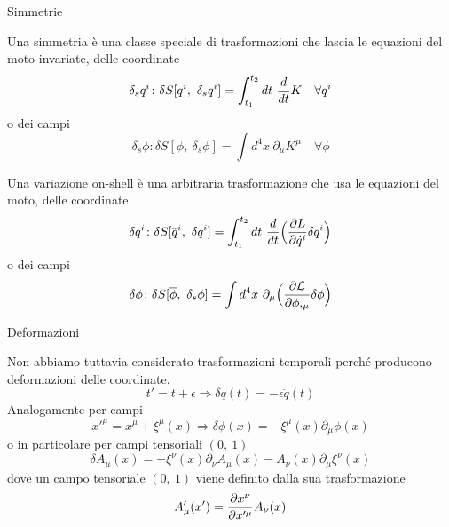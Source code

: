 \begin{frame}{Simmetrie}
    
    Una simmetria è una classe speciale di trasformazioni che lascia le equazioni del moto invariate, delle coordinate
    \begin{equation*}
         \delta_s q^i \colon \delta S[q^i, ~\delta_s q^i] = \int_{t_1}^{t_2}dt~ \frac{d}{dt} K \quad \forall q^i
    \end{equation*} 
    o dei campi
    \begin{equation*}
         \delta_s \phi \colon \delta S[\phi, ~\delta_s \phi] = \int d^4 x ~ \partial_\mu K^\mu \quad \forall \phi
    \end{equation*}

    Una variazione on-shell è una arbitraria trasformazione che usa le equazioni del moto, delle coordinate
    \begin{equation*}
        \delta q^i \colon \delta S[\overline q^i,~\delta q^i] = \int_{t_1}^{t_2}dt~ \frac{d}{dt} \Big( \frac{\partial L}{\partial\dot q^i} \delta q^i \Big )
    \end{equation*} 
    o dei campi
    \begin{equation*}
        \delta \phi \colon \delta S[\overline \phi, ~\delta_s \phi] = \int d^4 x ~ \partial_\mu \Big ( \frac{\partial\mathcal L}{\partial\phi,_\mu}  \delta \phi \Big) 
    \end{equation*}

\end{frame}

\begin{frame}{Deformazioni}
    
    Non abbiamo tuttavia considerato trasformazioni temporali perché producono deformazioni delle coordinate.
    \begin{equation*}
        t' = t + \epsilon \Rightarrow \delta q(t) = - \epsilon \dot q(t)
    \end{equation*}
    Analogamente per campi 
    \begin{equation*}
        x'^\mu = x^\mu + \xi^\mu(x) \Rightarrow \delta \phi(x) = - \xi^\mu(x) \partial_\mu \phi(x)
    \end{equation*}
    o in particolare per campi tensoriali $(0,~1)$ 
    \begin{equation*}
        \delta A_\mu(x) = - \xi^\nu(x) \partial_\nu A_\mu (x) - A_\nu(x) \partial_\mu \xi^\nu(x)
    \end{equation*}
    dove un campo tensoriale $(0, ~1)$ viene definito dalla sua trasformazione
    \begin{equation*}
        A'_\mu(x') = \frac{\partial x^\nu}{\partial x'^\mu} A_\nu(x)
    \end{equation*}

\end{frame}

